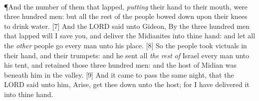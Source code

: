 {\\
\P \textcolor[rgb]{0.00,0.00,1.00}{And the number of them that lapped, \emph{putting} their hand to their mouth, were three hundred men: but all the rest of the people bowed down upon their knees to drink water.}
[7] \textcolor[rgb]{0.00,0.00,1.00}{And the LORD said unto Gideon, By the three hundred men that lapped will I save you, and deliver the Midianites into thine hand: and let all the \emph{other} people go every man unto his place.}%
[8] \textcolor[rgb]{0.00,0.00,1.00}{So the people took victuals in their hand, and their trumpets: and he sent all \emph{the} \emph{rest} \emph{of} Israel every man unto his tent, and retained those three hundred men: and the host of Midian was beneath him in the valley.}
[9] \textcolor[rgb]{0.00,0.00,1.00}{And it came to pass the same night, that the LORD said unto him, Arise, get thee down unto the host; for I have delivered it into thine hand.}\\
}
